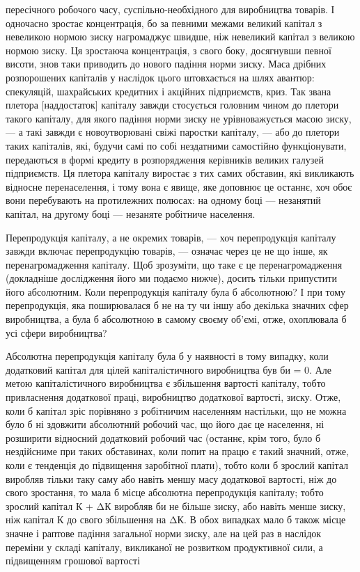 \parcont{}  %
пересічного робочого часу, суспільно-необхідного для виробництва
товарів. І одночасно зростає концентрація, бо за певними
межами великий капітал з невеликою нормою зиску нагромаджує
швидше, ніж невеликий капітал з великою нормою зиску. Ця
зростаюча концентрація, з свого боку, досягнувши певної висоти,
знов таки приводить до нового падіння норми зиску. Маса дрібних
розпорошених капіталів у наслідок цього штовхається на шлях
авантюр: спекуляцій, шахрайських кредитних і акційних підприємств,
криз. Так звана плетора [наддостаток] капіталу завжди
стосується головним чином до плетори такого капіталу, для якого
падіння норми зиску не урівноважується масою зиску, — а такі
завжди є новоутворювані свіжі паростки капіталу, — або до плетори
таких капіталів, які, будучи самі по собі нездатними самостійно
функціонувати, передаються в формі кредиту в розпорядження
керівників великих галузей підприємств. Ця плетора капіталу виростає
з тих самих обставин, які викликають відносне перенаселення,
і тому вона є явище, яке доповнює це останнє, хоч обоє
вони перебувають на протилежних полюсах: на одному боці — незанятий
капітал, на другому боці — незаняте робітниче населення.

Перепродукція капіталу, а не окремих товарів, — хоч перепродукція
капіталу завжди включає перепродукцію товарів, —
означає через це не що інше, як перенагромадження капіталу.
Щоб зрозуміти, що таке є це перенагромадження (докладніше
дослідження його ми подаємо нижче), досить тільки припустити
його абсолютним. Коли перепродукція капіталу була б абсолютною?
І при тому перепродукція, яка поширювалася б не на ту
чи іншу або декілька значних сфер виробництва, а була б абсолютною
в самому своєму об’ємі, отже, охоплювала б усі сфери
виробництва?

Абсолютна перепродукція капіталу була б у наявності в тому
випадку, коли додатковий капітал для цілей капіталістичного
виробництва був би = 0. Але метою капіталістичного виробництва
є збільшення вартості капіталу, тобто привласнення додаткової
праці, виробництво додаткової вартості, зиску. Отже,
коли б капітал зріс порівняно з робітничим населенням настільки,
що не можна було б ні здовжити абсолютний робочий час, що
його дає це населення, ні розширити відносний додатковий робочий
час (останнє, крім того, було б нездійсниме при таких обставинах,
коли попит на працю є такий значний, отже, коли є тенденція
до підвищення заробітної плати), тобто коли б зрослий
капітал виробляв тільки таку саму або навіть меншу масу додаткової
вартості, ніж до свого зростання, то мала б місце абсолютна
перепродукція капіталу; тобто зрослий капітал К + ΔК виробляв
би не більше зиску, або навіть менше зиску, ніж капітал К
до свого збільшення на ΔК. В обох випадках мало б також
місце значне і раптове падіння загальної норми зиску, але на
цей раз в наслідок переміни у складі капіталу, викликаної не розвитком
продуктивної сили, а підвищенням грошової вартості
\parbreak{}  %
